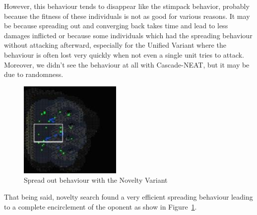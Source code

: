 However, this behaviour tends to disappear like the stimpack behavior,
probably because the fitness of these individuals is not as good for
various reasons.  It may be because spreading out and converging back
takes time and lead to less damages inflicted or because some
individuals which had the spreading behaviour without attacking
afterward, especially for the Unified Variant where the behaviour is
often lost very quickly when not even a single unit tries to attack.
Moreover, we didn't see the behaviour at all with Cascade-NEAT, but it
may be due to randomness.

\begin{figure}
    \includegraphics[width=.25\textwidth]{figures/spreading_behaviour_novelty}
    \caption{Spread out behaviour with the Novelty Variant}\label{fig:spreading-behaviour-novelty}
\end{figure}

That being said, novelty search found a very efficient spreading
behaviour leading to a complete encirclement of the oponent as show in
Figure~\ref{fig:spreading-behaviour-novelty}.

